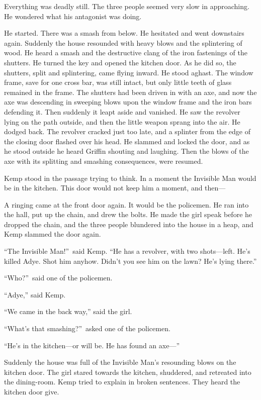 Everything was deadly still. The three people seemed very slow in approaching. He wondered what his antagonist was doing.

He started. There was a smash from below. He hesitated and went downstairs again. Suddenly the house resounded with heavy blows and the splintering of wood. He heard a smash and the destructive clang of the iron fastenings of the shutters. He turned the key and opened the kitchen door. As he did so, the shutters, split and splintering, came flying inward. He stood aghast. The window frame, save for one cross bar, was still intact, but only little teeth of glass remained in the frame. The shutters had been driven in with an axe, and now the axe was descending in sweeping blows upon the window frame and the iron bars defending it. Then suddenly it leapt aside and vanished. He saw the revolver lying on the path outside, and then the little weapon sprang into the air. He dodged back. The revolver cracked just too late, and a splinter from the edge of the closing door flashed over his head. He slammed and locked the door, and as he stood outside he heard Griffin shouting and laughing. Then the blows of the axe with its splitting and smashing consequences, were resumed.

Kemp stood in the passage trying to think. In a moment the Invisible Man would be in the kitchen. This door would not keep him a moment, and then—

A ringing came at the front door again. It would be the policemen. He ran into the hall, put up the chain, and drew the bolts. He made the girl speak before he dropped the chain, and the three people blundered into the house in a heap, and Kemp slammed the door again.

“The Invisible Man!”\ said Kemp. “He has a revolver, with two shots—left. He’s killed Adye. Shot him anyhow. Didn’t you see him on the lawn? He’s lying there.”

“Who?”\ said one of the policemen.

“Adye,” said Kemp.

“We came in the back way,” said the girl.

“What’s that smashing?”\ asked one of the policemen.

“He’s in the kitchen—or will be. He has found an axe—”

Suddenly the house was full of the Invisible Man’s resounding blows on the kitchen door. The girl stared towards the kitchen, shuddered, and retreated into the dining-room. Kemp tried to explain in broken sentences. They heard the kitchen door give.

